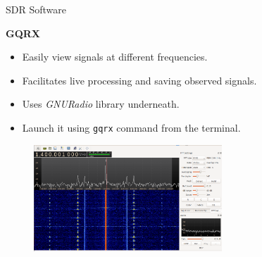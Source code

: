 \documentclass[handout]{beamer}
\begin{document}
\begin{frame}{SDR Software}  

\footnotesize
\textbf{GQRX}

	\begin{itemize}
	\footnotesize
	\item Easily view signals at different frequencies.
		\vspace{5pt}
	\item Facilitates live processing and saving observed signals.
		\vspace{5pt}
	\item Uses \emph{GNURadio} library underneath.
		\vspace{5pt}
	\item Launch it using \texttt{gqrx} command from the terminal.
	\end{itemize}

	\begin{figure}
		\includegraphics[width=200pt]{figures/gqrx-window.png}
	\end{figure}

\end{frame}
\end{document}
